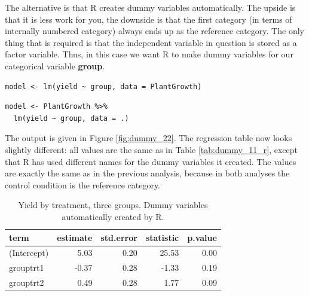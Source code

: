 \documentclass[]{book}\usepackage[]{graphicx}\usepackage[]{color}
\begin{document}
The alternative is that R creates dummy variables automatically. The upside is that it is less work for you, the downside is that the first category (in terms of internally numbered category) always ends up as the reference category. The only thing that is required is that the independent variable in question is stored as a factor variable. Thus, in this case we want R to make dummy variables for our categorical variable \textbf{group}.


% 

\begin{lstlisting}  
model <- lm(yield ~ group, data = PlantGrowth)
\end{lstlisting}

\begin{lstlisting}  
model <- PlantGrowth %>% 
  lm(yield ~ group, data = .)
\end{lstlisting}





The output is given in Figure \ref{fig:dummy_22}. The regression table now looks slightly different: all values are the same as in Table \ref{tab:dummy_11_r}, except that R has used different names for the dummy variables it created. The values are exactly the same as in the previous analysis, because in both analyses the control condition is the reference category.

\begin{table}[ht]
\centering
\caption{Yield by treatment, three groups. Dummy variables automatically created by R.} 
\label{tab:dummy_22_r}
\begin{tabular}{lrrrr}
  \hline
term & estimate & std.error & statistic & p.value \\ 
  \hline
(Intercept) & 5.03 & 0.20 & 25.53 & 0.00 \\ 
  grouptrt1 & -0.37 & 0.28 & -1.33 & 0.19 \\ 
  grouptrt2 & 0.49 & 0.28 & 1.77 & 0.09 \\ 
   \hline
\end{tabular}
\end{table}
\end{document}

